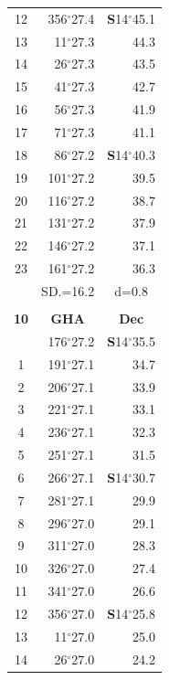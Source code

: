\documentclass[10pt, a4paper]{report}
\begin{document}
\begin{scriptsize}
\begin{tabular*}{0.2\textwidth}[t]{@{\extracolsep{\fill}}|c|rr|}
12 & 356$^\circ$27.4 & \textbf{S}14$^\circ$45.1\\
13 & 11$^\circ$27.3 & 44.3\\
14 & 26$^\circ$27.3 & 43.5\\
15 & 41$^\circ$27.3 & \raisebox{0.24ex}{\boldmath$\cdot$~\boldmath$\cdot$~~}42.7\\
16 & 56$^\circ$27.3 & 41.9\\
17 & 71$^\circ$27.3 & 41.1\\[2Pt]
18 & 86$^\circ$27.2 & \textbf{S}14$^\circ$40.3\\
19 & 101$^\circ$27.2 & 39.5\\
20 & 116$^\circ$27.2 & 38.7\\
21 & 131$^\circ$27.2 & \raisebox{0.24ex}{\boldmath$\cdot$~\boldmath$\cdot$~~}37.9\\
22 & 146$^\circ$27.2 & 37.1\\
23 & 161$^\circ$27.2 & 36.3\\
\hline
\rule{0pt}{2.4ex} & \multicolumn{1}{c}{SD.=16.2} & \multicolumn{1}{c|}{d=0.8}\\
\hline
\multicolumn{1}{c}{}\\[-0.5ex]\hline
\multicolumn{1}{|c|}{\rule{0pt}{2.6ex}\textbf{10}} & \multicolumn{1}{c}{\textbf{GHA}} & \multicolumn{1}{c|}{\textbf{Dec}}\\
\hline\rule{0pt}{2.6ex}\noindent
0 & 176$^\circ$27.2 & \textbf{S}14$^\circ$35.5\\
1 & 191$^\circ$27.1 & 34.7\\
2 & 206$^\circ$27.1 & 33.9\\
3 & 221$^\circ$27.1 & \raisebox{0.24ex}{\boldmath$\cdot$~\boldmath$\cdot$~~}33.1\\
4 & 236$^\circ$27.1 & 32.3\\
5 & 251$^\circ$27.1 & 31.5\\[2Pt]
6 & 266$^\circ$27.1 & \textbf{S}14$^\circ$30.7\\
7 & 281$^\circ$27.1 & 29.9\\
8 & 296$^\circ$27.0 & 29.1\\
9 & 311$^\circ$27.0 & \raisebox{0.24ex}{\boldmath$\cdot$~\boldmath$\cdot$~~}28.3\\
10 & 326$^\circ$27.0 & 27.4\\
11 & 341$^\circ$27.0 & 26.6\\[2Pt]
12 & 356$^\circ$27.0 & \textbf{S}14$^\circ$25.8\\
13 & 11$^\circ$27.0 & 25.0\\
14 & 26$^\circ$27.0 & 24.2\\

\end{tabular*}
\end{scriptsize}
\end{document}
